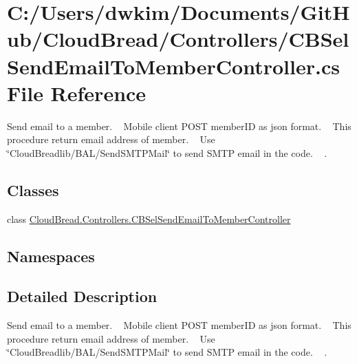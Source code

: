 \hypertarget{a00152}{}\section{C\+:/\+Users/dwkim/\+Documents/\+Git\+Hub/\+Cloud\+Bread/\+Controllers/\+C\+B\+Sel\+Send\+Email\+To\+Member\+Controller.cs File Reference}
\label{a00152}


Send email to a member. ~\newline
Mobile client P\+O\+ST member\+ID as json format. ~\newline
This procedure return email address of member. ~\newline
 Use \char`\"{}\+Cloud\+Breadlib/\+B\+A\+L/\+Send\+S\+M\+T\+P\+Mail\char`\"{} to send S\+M\+TP email in the code. ~\newline
.  


\subsection*{Classes}
\begin{DoxyCompactItemize}
\item 
class \hyperlink{a00040}{Cloud\+Bread.\+Controllers.\+C\+B\+Sel\+Send\+Email\+To\+Member\+Controller}
\end{DoxyCompactItemize}
\subsection*{Namespaces}
\begin{DoxyCompactItemize}
\end{DoxyCompactItemize}


\subsection{Detailed Description}
Send email to a member. ~\newline
Mobile client P\+O\+ST member\+ID as json format. ~\newline
This procedure return email address of member. ~\newline
 Use \char`\"{}\+Cloud\+Breadlib/\+B\+A\+L/\+Send\+S\+M\+T\+P\+Mail\char`\"{} to send S\+M\+TP email in the code. ~\newline
. 

